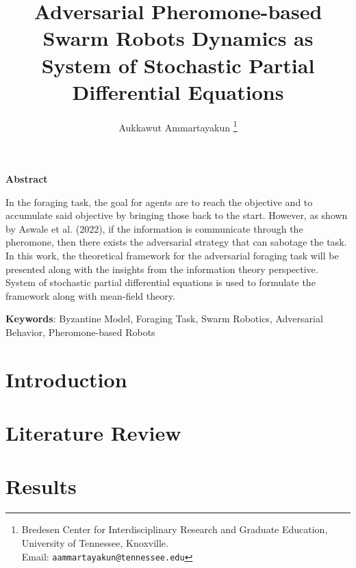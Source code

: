 \documentclass[12pt]{article}
\begin{document}
\title{Adversarial Pheromone-based Swarm Robots Dynamics as System of Stochastic Partial Differential Equations}  

\author{
Aukkawut Ammartayakun   \thanks{Bredesen Center for Interdisciplinary Research and Graduate Education, University of Tennessee, Knoxville.  \\Email: {\tt aammartayakun@tennessee.edu}}  
}

\maketitle

\begin{center}
\textbf{Abstract}
\end{center}

In the foraging task, the goal for agents are to reach the objective and to accumulate said objective by bringing those back to the start. However, as shown by Aswale et al. (2022), if the information is communicate through the pheromone, then there exists the adversarial strategy that can sabotage the task. In this work, the theoretical framework for the adversarial foraging task will be presented along with the insights from the information theory perspective. System of stochastic partial differential equations is used to formulate the framework along with mean-field theory. 

\noindent
\textbf{Keywords}: Byzantine Model, Foraging Task, Swarm Robotics, Adversarial Behavior, Pheromone-based Robots

\thispagestyle{empty}

\newpage


\section{Introduction}\label{intro}

\section{Literature Review}
\section{Results}
\end{document}

